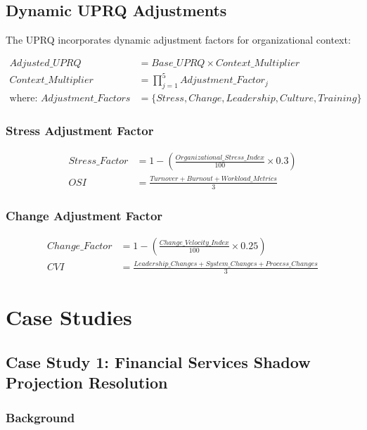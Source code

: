 \documentclass[11pt,a4paper]{article}
\begin{document}
\subsection{Dynamic UPRQ Adjustments}

The UPRQ incorporates dynamic adjustment factors for organizational context:

\begin{align}
Adjusted\_UPRQ &= Base\_UPRQ \times Context\_Multiplier \\
Context\_Multiplier &= \prod_{j=1}^{5} Adjustment\_Factor_j \\
\text{where: } Adjustment\_Factors &= \{Stress, Change, Leadership, Culture, Training\}
\end{align}

\subsubsection{Stress Adjustment Factor}

\begin{align}
Stress\_Factor &= 1 - \left(\frac{Organizational\_Stress\_Index}{100} \times 0.3\right) \\
OSI &= \frac{Turnover + Burnout + Workload\_Metrics}{3}
\end{align}

\subsubsection{Change Adjustment Factor}

\begin{align}
Change\_Factor &= 1 - \left(\frac{Change\_Velocity\_Index}{100} \times 0.25\right) \\
CVI &= \frac{Leadership\_Changes + System\_Changes + Process\_Changes}{3}
\end{align}

\section{Case Studies}

\subsection{Case Study 1: Financial Services Shadow Projection Resolution}

\subsubsection{Background}
\end{document}

